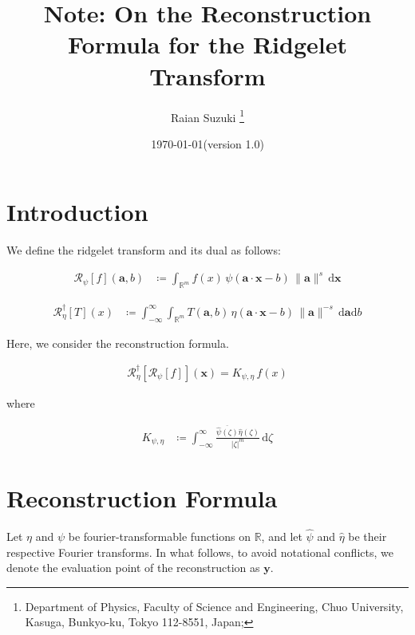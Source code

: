 \documentclass[a4paper,12pt]{article}
\newcommand{\intinf}{\int_{-\infty}^{\infty}}
\newcommand{\intrm}{\int_{\mathbb{R}^m}}
\newcommand{\R}{\mathbb{R}}
\newcommand{\Rid}{\mathscr{R}}
\newcommand{\Ridd}{\mathscr{R}^{\dagger}}
\newcommand{\z}{\zeta}
\newcommand{\va}{\bm{a}}
\newcommand{\vx}{\bm{x}}
\newcommand{\vy}{\bm{y}}
\newcommand{\nora}{\|\bm{a}\|}
\newcommand{\absz}{|\z|}
\newcommand{\da}{\mathrm{d}\va}
\newcommand{\dx}{\mathrm{d}\vx}
\newcommand{\db}{\mathrm{d}b}
\newcommand{\dd}{\mathrm{d}}
\newcommand{\psihat}{\widehat{\psi}}
\newcommand{\etahat}{\widehat{\eta}}
\begin{document}
\title{
\bf 
Note: On the Reconstruction Formula for the Ridgelet Transform
}
\author{
Raian Suzuki
\footnote{
Department of Physics,
Faculty of Science and Engineering,
Chuo University, 
Kasuga, Bunkyo-ku, Tokyo 112-8551, Japan;
} 
}

\date{\today (version 1.0)}

\pagestyle{plain}
\maketitle

  

\clearpage

\section{Introduction}

We define the ridgelet transform and its dual as follows:

\begin{align}
  \Rid_\psi[f](\va, b) &\coloneqq \intrm f(x) \, \psi(\va \cdot \vx - b) \, \nora^s \, \dx
\end{align}

\begin{align}
  \Ridd_{\eta}[T](x) &\coloneqq \intinf \intrm  T(\va, b) \, \eta(\va \cdot \vx - b) \, \nora^{-s}\, \da \db
\end{align}

Here, we consider the reconstruction formula.

\begin{align}
  \Ridd_{\eta}[\Rid_\psi[f]](\vx) = K_{\psi, \eta} \, f(x)
\end{align}

where 

\begin{align}
  K_{\psi, \eta} &\coloneqq \intinf \frac{\overline{\psihat(\z)}\etahat(\z)}{\absz^{m}} \, \dd \z
\end{align}

\clearpage

\section{Reconstruction Formula}

Let $\eta$ and $\psi$ be fourier-transformable functions on $\R$, and let $\psihat$ and $\etahat$ be their respective Fourier transforms.
In what follows, to avoid notational conflicts, we denote the evaluation point of the reconstruction as $\vy$.
\end{document}
